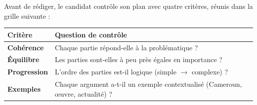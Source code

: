 \documentclass[11pt]{article}
\begin{document}
Avant de rédiger, le candidat contrôle son plan avec quatre critères, réunis dans la grille suivante :

\begin{center}
\begin{tabularx}{\linewidth}{|l|X|}\hline
\rowcolor{popblueL} \textbf{Critère} & \textbf{Question de contrôle} \\ \hline
\textbf{Cohérence} & Chaque partie répond-elle à la problématique ? \\ \hline
\textbf{Équilibre} & Les parties sont-elles à peu près égales en importance ? \\ \hline
\textbf{Progression} & L'ordre des parties est-il logique (simple $\rightarrow$ complexe) ? \\ \hline
\textbf{Exemples} & Chaque argument a-t-il un exemple contextualisé (Cameroun, œuvre, actualité) ? \\ \hline
\end{tabularx}
\end{center}
\end{document}
